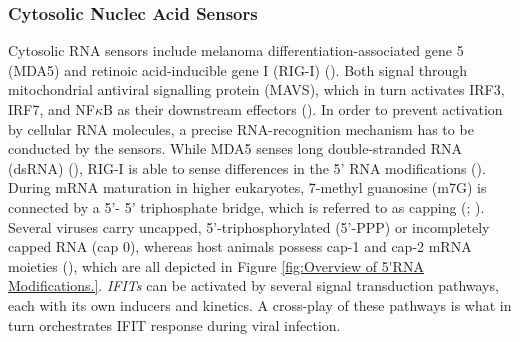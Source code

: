 \subsubsection{Cytosolic Nuclec Acid Sensors} \label{Cytosolic Nuclec Acid Sensors}
Cytosolic RNA sensors include melanoma differentiation-associated gene 5 (MDA5) and retinoic acid-inducible gene I (RIG-I) (\cite{Vladimer2014IFITs:Proteins}). Both signal through mitochondrial antiviral signalling protein (MAVS), which in turn activates IRF3, IRF7, and NF\(\kappa\)B as their downstream effectors (\cite{Ashley2019Interferon-IndependentCytomegalovirus}). In order to prevent activation by cellular RNA molecules, a precise RNA-recognition mechanism has to be conducted by the sensors. While MDA5 senses long double-stranded RNA (dsRNA) (\cite{Brisse2019ComparativeMDA5}), RIG-I is able to sense differences in the 5' RNA modifications (\cite{Schlee2016DiscriminatingSensing}). During mRNA maturation in higher eukaryotes, 7-methyl guanosine (m7G) is connected by a 5'- 5' triphosphate bridge, which is referred to as capping (\cite{Devarkar2016StructuralRIG-I}; \cite{Ramanathan2016MRNAApplications}). Several viruses carry uncapped, 5'-triphosphorylated (5'-PPP) or incompletely capped RNA (cap 0), whereas host animals possess cap-1 and cap-2 mRNA moieties (\cite{Choi2018ACaps}), which are all depicted in Figure \ref{fig:Overview of 5'RNA Modifications.}. \textit{IFITs} can be activated by several signal transduction pathways, each with its own inducers and kinetics. A cross-play of these pathways is what in turn orchestrates IFIT response during viral infection.

